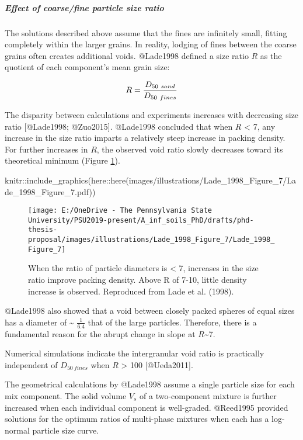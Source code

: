\documentclass[
]{article}
\newenvironment{Shaded}{\begin{snugshade}}{\end{snugshade}}
\newcommand{\FunctionTok}[1]{\textcolor[rgb]{0.00,0.00,0.00}{#1}}
\newcommand{\NormalTok}[1]{#1}
\newcommand{\SpecialCharTok}[1]{\textcolor[rgb]{0.00,0.00,0.00}{#1}}
\newcommand{\StringTok}[1]{\textcolor[rgb]{0.31,0.60,0.02}{#1}}
\begin{document}
\hypertarget{tfc-size-ratio}{%
\subparagraph{Effect of coarse/fine particle size ratio}\label{tfc-size-ratio}}

The solutions described above assume that the fines are infinitely small, fitting completely within the larger grains.
In reality, lodging of fines between the coarse grains often creates additional voids.
@Lade1998 defined a size ratio \(R\) as the quotient of each component's mean grain size:

\begin{equation}
R=\frac{D_{50~sand}}{D_{50~fines}} \\
\label{eq:tfc-size-ratio}
\end{equation}

The disparity between calculations and experiments increases with decreasing size ratio {[}@Lade1998; @Zuo2015{]}.
@Lade1998 concluded that when \(R\) \textless{} 7, any increase in the size ratio imparts a relatively steep increase in packing density.
For further increases in \(R\), the observed void ratio slowly decreases toward its theoretical minimum (Figure \ref{fig:lade-1998-figure-7}).

\begin{Shaded}
\begin{Highlighting}[]
\NormalTok{knitr}\SpecialCharTok{::}\FunctionTok{include\_graphics}\NormalTok{(here}\SpecialCharTok{::}\FunctionTok{here}\NormalTok{(}\StringTok{\textquotesingle{}images/illustrations/Lade\_1998\_Figure\_7/Lade\_1998\_Figure\_7.pdf\textquotesingle{}}\NormalTok{))}
\end{Highlighting}
\end{Shaded}

\begin{figure}
\texttt{[image: E:/OneDrive - The Pennsylvania State University/PSU2019-present/A\_inf\_soils\_PhD/drafts/phd-thesis-proposal/images/illustrations/Lade\_1998\_Figure\_7/Lade\_1998\_Figure\_7]} \caption[Importance of particle diameter ratio for intergranular packing]{When the ratio of particle diameters is < 7, increases in the size ratio improve packing density. Above R of 7-10, little density increase is observed. Reproduced from Lade et al. (1998).}\label{fig:lade-1998-figure-7}
\end{figure}

@Lade1998 also showed that a void between closely packed spheres of equal sizes has a diameter of \textasciitilde{} \(\frac{1}{6.4}\) that of the large particles.
Therefore, there is a fundamental reason for the abrupt change in slope at \(R\)\textasciitilde7.

Numerical simulations indicate the intergranular void ratio is practically independent of \(D_{50~fines}\) when \(R\) \textgreater{} 100 {[}@Ueda2011{]}.

The geometrical calculations by @Lade1998 assume a single particle size for each mix component.
The solid volume \(V_s\) of a two-component mixture is further increased when each individual component is well-graded.
@Reed1995 provided solutions for the optimum ratios of multi-phase mixtures when each has a log-normal particle size curve.
\end{document}
